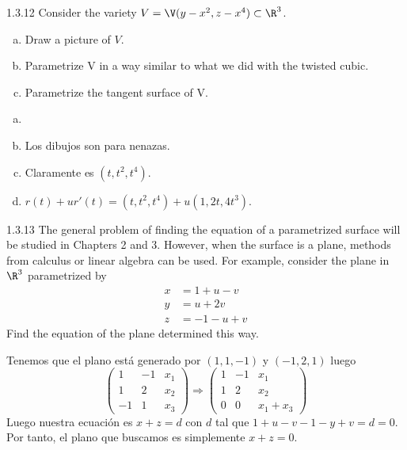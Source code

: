\documentclass[twoside]{article}
\begin{document}
\begin{ejercicio}{1.3.12}
Consider the variety $V=\V(y-x^2,z-x^4) \subset \R^3$.
\begin{enumerate}[a.]
\item Draw a picture of $V$.
\item Parametrize V in a way similar to what we did with the twisted cubic.
\item Parametrize the tangent surface of V.
\end{enumerate}
\begin{solucion}
\begin{enumerate}[a.]
\item[]
\item Los dibujos son para nenazas.
\item Claramente es $(t,t^2,t^4)$. 
\item $r(t)+ur'(t) = (t,t^2,t^4)+u(1,2t,4t^3)$.
\end{enumerate}
\end{solucion}

\end{ejercicio}


\newpage

\begin{ejercicio}{1.3.13}
The general problem of finding the equation of a parametrized surface will be studied in Chapters 2 and 3. However, when the surface is a plane, methods from calculus or linear algebra can be used. For example, consider the plane in $\R^3$ parametrized by
\begin{align*}
x&=1+u-v\\
y&=u+2v\\
z&=-1-u+v
\end{align*}
Find the equation of the plane determined this way.
\begin{solucion}
Tenemos que el plano está generado por $(1,1,-1)$ y $(-1,2,1)$ luego
$$
\begin{pmatrix}
1 & -1 & x_1\\
1 & 2 & x_2\\
-1& 1 & x_3
\end{pmatrix} \Longrightarrow
\begin{pmatrix}
1 & -1 & x_1\\
1 & 2 & x_2\\
0 &0  & x_1 + x_3
\end{pmatrix}
$$
Luego nuestra ecuación es $x+z=d$ con $d$ tal que $1+u-v -1-y+v = d = 0$. Por tanto, el plano que buscamos es simplemente $x+z=0$.
\end{solucion}

\end{ejercicio}
\end{document}
